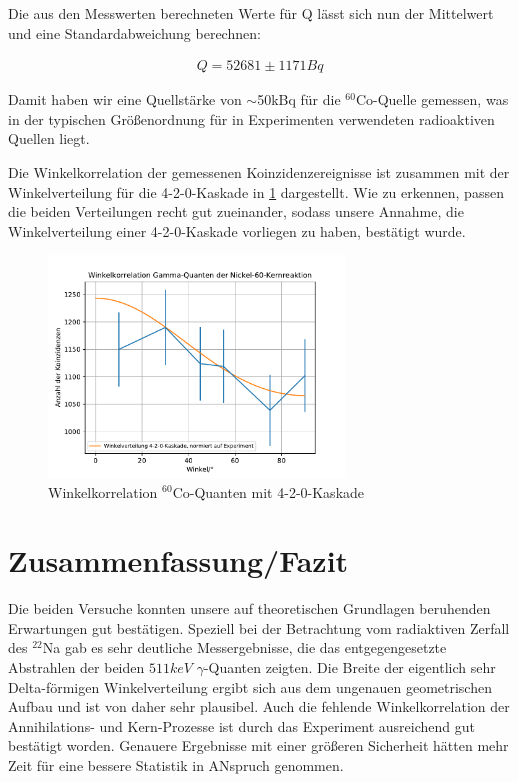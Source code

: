 \documentclass[11pt]{scrartcl}
\begin{document}
Die aus den Messwerten berechneten Werte für Q lässt sich nun der Mittelwert und eine Standardabweichung berechnen:

\begin{align}
Q=52681 \pm 1171 Bq
\end{align}

Damit haben wir eine Quellstärke von $\sim$50kBq für die $^{60}$Co-Quelle gemessen, was in der typischen Größenordnung für in Experimenten verwendeten radioaktiven Quellen liegt. 

Die Winkelkorrelation der gemessenen Koinzidenzereignisse ist zusammen mit der Winkelverteilung für die 4-2-0-Kaskade in \ref{Co60} dargestellt. Wie zu erkennen, passen die beiden Verteilungen recht gut zueinander, sodass unsere Annahme, die Winkelverteilung einer 4-2-0-Kaskade vorliegen zu haben, bestätigt wurde. 


\begin{figure}[htbp]  
     \includegraphics[width=0.7\textwidth]{Winkelkorrelation_Gamma-Quanten_der_Nickel-60-Kernreaktion.pdf}
  \caption{Winkelkorrelation $^{60}$Co-Quanten mit 4-2-0-Kaskade}
  \label{Co60}
\end{figure}




\section{Zusammenfassung/Fazit}

Die beiden Versuche konnten unsere auf theoretischen Grundlagen beruhenden Erwartungen gut bestätigen.
Speziell bei der Betrachtung vom radiaktiven Zerfall des $^22$Na gab es sehr deutliche Messergebnisse,
die das entgegengesetzte Abstrahlen der beiden $511keV$ $\gamma$-Quanten zeigten. Die Breite der
eigentlich sehr Delta-förmigen Winkelverteilung ergibt sich aus dem ungenauen geometrischen Aufbau und
ist von daher sehr plausibel. Auch die fehlende Winkelkorrelation der Annihilations- und Kern-Prozesse
ist durch das Experiment ausreichend gut bestätigt worden. Genauere Ergebnisse mit einer größeren
Sicherheit hätten mehr Zeit für eine bessere Statistik in ANspruch genommen.
\end{document}
